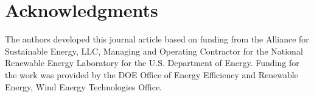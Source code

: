 \documentclass[conf]{new-aiaa}
\begin{document}




\section*{Acknowledgments}

The authors developed this journal article based on funding from the Alliance for Sustainable Energy, LLC, Managing and Operating Contractor for the National Renewable Energy Laboratory for the U.S. Department of Energy. Funding for the work was provided by the DOE Office of Energy Efficiency and Renewable Energy, Wind Energy Technologies Office.
\end{document}
